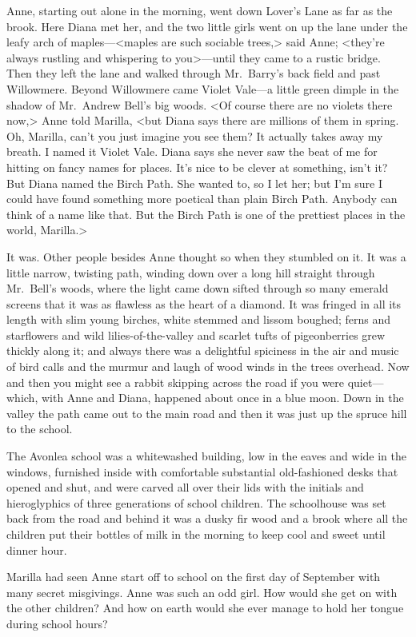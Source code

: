 Anne, starting out alone in the morning, went down Lover's Lane as far as the brook. Here Diana met her, and the two little girls went on up the lane under the leafy arch of maples—<maples are such sociable trees,> said Anne; <they're always rustling and whispering to you>—until they came to a rustic bridge. Then they left the lane and walked through Mr.~Barry's back field and past Willowmere. Beyond Willowmere came Violet Vale—a little green dimple in the shadow of Mr.~Andrew Bell's big woods. <Of course there are no violets there now,> Anne told Marilla, <but Diana says there are millions of them in spring. Oh, Marilla, can't you just imagine you see them? It actually takes away my breath. I named it Violet Vale. Diana says she never saw the beat of me for hitting on fancy names for places. It's nice to be clever at something, isn't it? But Diana named the Birch Path. She wanted to, so I let her; but I'm sure I could have found something more poetical than plain Birch Path. Anybody can think of a name like that. But the Birch Path is one of the prettiest places in the world, Marilla.>

It was. Other people besides Anne thought so when they stumbled on it. It was a little narrow, twisting path, winding down over a long hill straight through Mr.~Bell's woods, where the light came down sifted through so many emerald screens that it was as flawless as the heart of a diamond. It was fringed in all its length with slim young birches, white stemmed and lissom boughed; ferns and starflowers and wild lilies-of-the-valley and scarlet tufts of pigeonberries grew thickly along it; and always there was a delightful spiciness in the air and music of bird calls and the murmur and laugh of wood winds in the trees overhead. Now and then you might see a rabbit skipping across the road if you were quiet—which, with Anne and Diana, happened about once in a blue moon. Down in the valley the path came out to the main road and then it was just up the spruce hill to the school.

The Avonlea school was a whitewashed building, low in the eaves and wide in the windows, furnished inside with comfortable substantial old-fashioned desks that opened and shut, and were carved all over their lids with the initials and hieroglyphics of three generations of school children. The schoolhouse was set back from the road and behind it was a dusky fir wood and a brook where all the children put their bottles of milk in the morning to keep cool and sweet until dinner hour.

Marilla had seen Anne start off to school on the first day of September with many secret misgivings. Anne was such an odd girl. How would she get on with the other children? And how on earth would she ever manage to hold her tongue during school hours?

